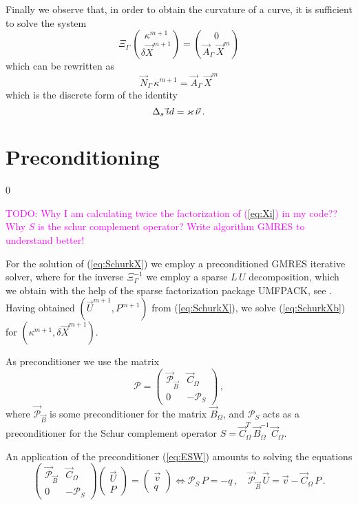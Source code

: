 \documentclass[a4paper,12pt,onecolumn]{article}
\newcommand{\id}{\rm id}
\begin{document}
Finally we observe that, in order to obtain the curvature of a curve, it is 
sufficient to solve the system
\begin{equation}
\Xi_\Gamma\,\binom{\kappa^{m+1}}{\delta\vec{X}^{m+1}} = 
\binom{0}{\vec{A}_\Gamma\,\vec{X}^{m}}
\end{equation}
which can be rewritten as
\begin{equation}
\vec{N}_\Gamma\,\kappa^{m+1} = \vec{A}_\Gamma\,\vec{X}^{m}
\end{equation}
which is the discrete form of the identity
\begin{equation}
\Delta_s\, \vec \id = \varkappa\, \vec\nu\,.
\end{equation}

\section{Preconditioning}\label{sec:preconditioning}
\setcounter{equation} 0

\textcolor{magenta}{TODO: Why I am calculating twice the factorization of 
(\ref{eq:Xi}) in my code?? Why $S$ is the schur complement operator? Write 
algorithm GMRES to understand better!}

For the solution of (\ref{eq:SchurkX}) we employ a preconditioned GMRES
iterative solver, where for the inverse $\Xi_\Gamma^{-1}$ we employ a sparse
$L\,U$ decomposition, which we obtain with the help of the sparse factorization
package UMFPACK, see \cite{Davis04}. Having obtained $(\vec U^{m+1}, P^{m+1})$
from (\ref{eq:SchurkX}), we solve (\ref{eq:SchurkXb}) for
$(\kappa^{m+1}, \delta\vec X^{m+1})$.

As preconditioner we use the matrix
\begin{equation} \label{eq:ESW}
\mathcal{P} = 
\begin{pmatrix}
\vec{\mathcal{P}}_{\vec B} & \vec C_\Omega \\
0 & -\mathcal{P}_S
\end{pmatrix}\,,
\end{equation}
where $\vec{\mathcal{P}}_{\vec B}$ is some preconditioner for the matrix $\vec
B_\Omega$, and $\mathcal{P}_S$ acts as a preconditioner for the Schur complement
operator $S=\vec C^T_\Omega \,\vec B_\Omega^{-1}\,\vec C_\Omega$.

An application of the preconditioner (\ref{eq:ESW}) amounts to solving the
equations
\begin{equation}
\begin{pmatrix}
\vec{\mathcal{P}}_{\vec B} & \vec C_\Omega \\
0 & -\mathcal{P}_S
\end{pmatrix}
\begin{pmatrix} 
\vec U \\ 
P 
\end{pmatrix}
= 
\begin{pmatrix} 
\vec v \\ 
q 
\end{pmatrix}
\iff
\mathcal{P}_S\,P = -q\,,\quad \vec{\mathcal{P}}_{\vec B}\,\vec U = \vec v -
\vec C_\Omega\,P\,.
\end{equation}
\end{document}
